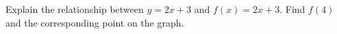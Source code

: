 Explain the relationship between $y=2x+3$ and $f(x)=2x+3$. Find $f(4)$ and the corresponding point on the graph.
